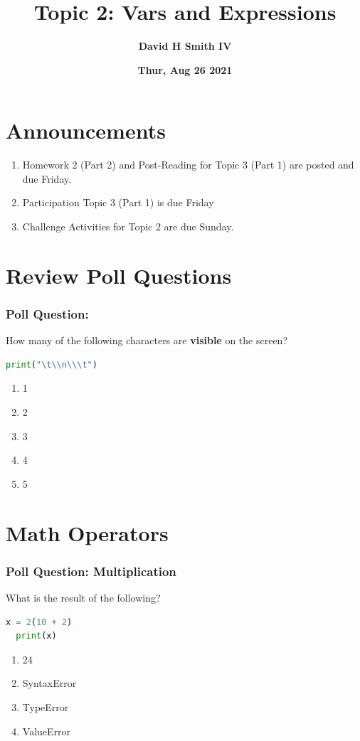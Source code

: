 \documentclass{beamer}
\title{\textbf{Topic 2: Vars and Expressions}}
\author{\textbf{David H Smith IV}}
\institute[\textbf{UIUC}]{\textbf{University of Illinois Urbana-Champaign}}
\date{\textbf{Thur, Aug 26 2021}}
\begin{document}
\frame{\titlepage}

\section{Announcements}

\begin{frame}
  \begin{enumerate}
    \item Homework 2 (Part 2) and Post-Reading for Topic 3 (Part 1) are posted and due Friday.
    \item Participation Topic 3 (Part 1) is due Friday
    \item Challenge Activities for Topic 2 are due Sunday.
  \end{enumerate}
\end{frame}

\section{Review Poll Questions}

%
%
%
\begin{frame}[fragile]
  \frametitle{Poll Question: }
  How many of the following characters are \textbf{visible} on the screen?\\
  \begin{lstlisting}[language=Python, autogobble]
  print("\t\\n\\\t")
  \end{lstlisting}
  \vfill
  \begin{minipage}{.48\textwidth}
    \begin{enumerate}[A]
      \item 1
      \item 2
      \item 3
      \item 4
      \item 5
    \end{enumerate}
  \end{minipage}
  \begin{minipage}{.48\textwidth}
  \end{minipage}
\end{frame}


\section{Math Operators}

%
%
%
\begin{frame}[fragile]
  \frametitle{Poll Question: Multiplication}
  \vfill
  What is the result of the following?
  \begin{lstlisting}[language=Python, autogobble]
  x = 2(10 + 2)
  print(x)
  \end{lstlisting}
  \vfill
  \begin{enumerate}[A]
    \item 24
    \item SyntaxError
    \item TypeError
    \item ValueError
  \end{enumerate}
\end{frame}
\end{document}
